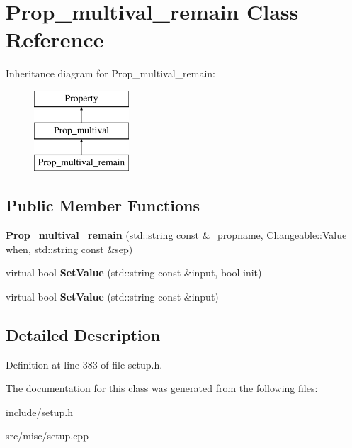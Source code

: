 \hypertarget{classProp__multival__remain}{\section{Prop\-\_\-multival\-\_\-remain Class Reference}
\label{classProp__multival__remain}
}
Inheritance diagram for Prop\-\_\-multival\-\_\-remain\-:\begin{figure}[H]
\begin{center}
\leavevmode
\includegraphics[height=3.000000cm]{classProp__multival__remain}
\end{center}
\end{figure}
\subsection*{Public Member Functions}
\begin{DoxyCompactItemize}
\item 
\hypertarget{classProp__multival__remain_a59450ef7be09d83d29831c5c378d79ad}{{\bfseries Prop\-\_\-multival\-\_\-remain} (std\-::string const \&\-\_\-propname, Changeable\-::\-Value when, std\-::string const \&sep)}\label{classProp__multival__remain_a59450ef7be09d83d29831c5c378d79ad}

\item 
\hypertarget{classProp__multival__remain_a73ff08a986693c879b330654de3152cc}{virtual bool {\bfseries Set\-Value} (std\-::string const \&input, bool init)}\label{classProp__multival__remain_a73ff08a986693c879b330654de3152cc}

\item 
\hypertarget{classProp__multival__remain_ac6f943a59a58acf45efe4c0ee51f3948}{virtual bool {\bfseries Set\-Value} (std\-::string const \&input)}\label{classProp__multival__remain_ac6f943a59a58acf45efe4c0ee51f3948}

\end{DoxyCompactItemize}


\subsection{Detailed Description}


Definition at line 383 of file setup.\-h.



The documentation for this class was generated from the following files\-:\begin{DoxyCompactItemize}
\item 
include/setup.\-h\item 
src/misc/setup.\-cpp\end{DoxyCompactItemize}
